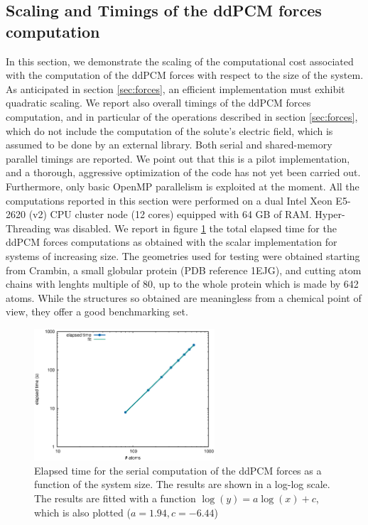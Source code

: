 \subsection{Scaling and Timings of the ddPCM forces computation}
In this section, we demonstrate the scaling of the computational cost associated with the computation of the ddPCM forces with respect to the size of the system. As anticipated in section \ref{sec:forces}, an efficient implementation must exhibit quadratic scaling. We report also overall timings of the ddPCM forces computation, and in particular of the operations described in section \ref{sec:forces}, which do not include the computation of the solute's electric field, which is assumed to be done by an external library. Both serial and shared-memory parallel timings are reported. We point out that this is a pilot implementation, and a thorough, aggressive optimization of the code has not yet been carried out. Furthermore, only basic OpenMP parallelism is exploited at the moment. 
All the computations reported in this section were performed on a dual Intel Xeon E5-2620 (v2) CPU cluster node (12 cores) equipped with 64 GB of RAM. Hyper-Threading was disabled. 
We report in figure \ref{fig:serial} the total elapsed time for the ddPCM forces computations as obtained with the scalar implementation for systems of increasing size. The geometries used for testing were obtained starting from Crambin, a small globular protein (PDB reference 1EJG), and cutting atom chains with lenghts multiple of 80, up to the whole protein which is made by 642 atoms. While the structures so obtained are meaningless from a chemical point of view, they offer a good benchmarking set. 
\begin{figure}
 \caption{Elapsed time for the serial computation of the ddPCM forces as a function of the system size. The results are shown in a log-log scale. The results are fitted with a function $\log (y) = a \log(x) + c$, which is also plotted ($a=1.94, c=-6.44$)\label{fig:serial}}
 \includegraphics[width=0.6\textwidth]{figs/serial.eps}
\end{figure}
